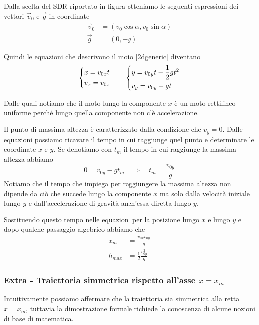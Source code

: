 \documentclass{article}
\begin{document}
Dalla scelta del SDR riportato in figura otteniamo le seguenti espressioni dei vettori $\Vec{v}_0$ e $\Vec{g}$ in coordinate
\begin{align}
  \Vec{v}_0 &= (v_0 \cos \alpha, v_0 \sin \alpha)\\
  \Vec{g} &= (0, -g)
\end{align}

Quindi le equazioni che descrivono il moto \ref{2dgeneric} diventano
\begin{equation}
  \begin{dcases}
    x = v_{0x} t \\
    v_x = v_{0x}
  \end{dcases}
  \qquad
  \begin{dcases}
    y = v_{0y} t - \frac{1}{2}gt^2 \\
    v_y = v_{0y} - gt
  \end{dcases}
\end{equation}

Dalle quali notiamo che il moto lungo la componente $x$ è un moto rettilineo uniforme perché lungo quella componente non c'è accelerazione.

Il punto di massima altezza è caratterizzato dalla condizione che $v_y =0$. Dalle equazioni possiamo ricavare il tempo in cui raggiunge quel punto e determinare le coordinate $x$ e $y$.
Se denotiamo con $t_m$ il tempo in cui raggiunge la massima altezza abbiamo
\begin{equation}
  0 = v_{0y} -gt_m \quad\Rightarrow\quad t_m = \frac{v_{0y}}{g}
\end{equation}
Notiamo che il tempo che impiega per raggiungere la massima altezza non dipende da ciò che succede lungo la componente $x$ ma solo dalla velocità iniziale lungo $y$ e dall'accelerazione di gravità anch'essa diretta lungo $y$.

Sostituendo questo tempo nelle equazioni per la posizione lungo $x$ e lungo $y$ e dopo qualche passaggio algebrico abbiamo che
\begin{align}
  x_m &= \frac{v_{0x}v_{0y}}{g} \\
  h_{max} &= \frac{1}{2}\frac{v_{0y}^2}{g}
\end{align}

\subsubsection{Extra - Traiettoria simmetrica rispetto all'asse $x=x_m$}
Intuitivamente possiamo affermare che la traiettoria sia simmetrica alla retta $x=x_m$, tuttavia la dimostrazione formale richiede la conoscenza di alcune nozioni di base di matematica.
\end{document}
